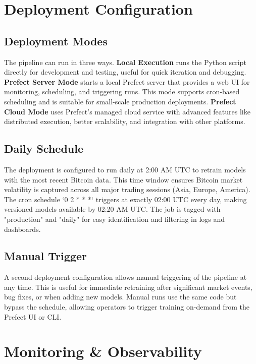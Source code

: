 \section{Deployment Configuration}

\subsection{Deployment Modes}

The pipeline can run in three ways. \textbf{Local Execution} runs the Python script directly for development and testing, useful for quick iteration and debugging. \textbf{Prefect Server Mode} starts a local Prefect server that provides a web UI for monitoring, scheduling, and triggering runs. This mode supports cron-based scheduling and is suitable for small-scale production deployments. \textbf{Prefect Cloud Mode} uses Prefect's managed cloud service with advanced features like distributed execution, better scalability, and integration with other platforms.

\subsection{Daily Schedule}

The deployment is configured to run daily at 2:00 AM UTC to retrain models with the most recent Bitcoin data. This time window ensures Bitcoin market volatility is captured across all major trading sessions (Asia, Europe, America). The cron schedule `0 2 * * *` triggers at exactly 02:00 UTC every day, making versioned models available by 02:20 AM UTC. The job is tagged with "production" and "daily" for easy identification and filtering in logs and dashboards.

\subsection{Manual Trigger}

A second deployment configuration allows manual triggering of the pipeline at any time. This is useful for immediate retraining after significant market events, bug fixes, or when adding new models. Manual runs use the same code but bypass the schedule, allowing operators to trigger training on-demand from the Prefect UI or CLI.

\section{Monitoring \& Observability}

